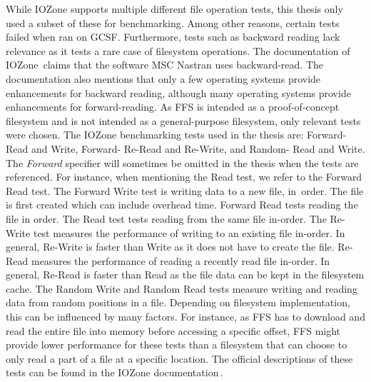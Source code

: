 While IOZone supports multiple different file operation tests, this thesis only used a subset of these for benchmarking. Among other reasons, certain tests failed when ran on \gls{GCSF}. Furthermore, tests such as backward reading lack relevance as it tests a rare case of filesystem operations. The documentation of IOZone\,\cite{iozoneIozoneFilesystemBenchmark} claims that the software MSC Nastran uses \mbox{backward-read}. The documentation also mentions that only a few operating systems provide enhancements for backward reading, although many operating systems provide enhancements for \mbox{forward-reading}. As \gls{FFS} is intended as a \mbox{proof-of-concept} filesystem and is not intended as a \mbox{general-purpose} filesystem, only relevant tests were chosen. The IOZone benchmarking tests used in the thesis are: Forward- Read and Write, Forward- \mbox{Re-Read} and \mbox{Re-Write}, and Random- Read and Write. The \textit{Forward} specifier will sometimes be omitted in the thesis when the tests are referenced. For instance, when mentioning the Read test, we refer to the Forward Read test. The Forward Write test is writing data to a new file, \mbox{in order}. The file is first created which can include overhead time. Forward Read tests reading the file in order. The Read test tests reading from the same file \mbox{in-order}. The \mbox{Re-Write} test measures the performance of writing to an existing file \mbox{in-order}. In general, \mbox{Re-Write} is faster than Write as it does not have to create the file. \mbox{Re-Read} measures the performance of reading a recently read file \mbox{in-order}. In general, \mbox{Re-Read} is faster than \mbox{Read} as the file data can be kept in the filesystem cache. The Random Write and Random Read tests measure writing and reading data from random positions in a file. Depending on filesystem implementation, this can be influenced by many factors. For instance, as \gls{FFS} has to download and read the entire file into memory before accessing a specific offset, \gls{FFS} might provide lower performance for these tests than a filesystem that can choose to only read a part of a file at a specific location. The official descriptions of these tests can be found in the IOZone documentation\,\cite{iozoneIozoneFilesystemBenchmark}.

